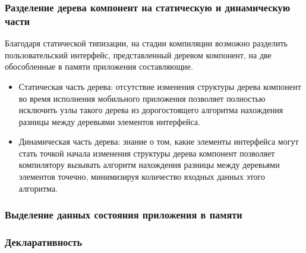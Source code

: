 \subsubsection*{Разделение дерева компонент на статическую и динамическую части}
Благодаря статической типизации, на стадии компиляции возможно разделить
пользовательский интерфейс, представленный деревом компонент,
на две обособленные в памяти приложения составляющие.
\begin{itemize}
	\item Статическая часть дерева: отсутствие изменения структуры
	дерева компонент во время исполнения мобильного приложения позволяет
	полностью исключить узлы такого дерева из дорогостоящего алгоритма
	нахождения разницы между деревьями элементов интерфейса.
	\item Динамическая часть дерева: знание о том, какие элементы
	интерфейса могут стать точкой начала изменения структуры дерева
	компонент позволяет компилятору вызывать алгоритм нахождения разницы
	между деревьями элементов точечно, минимизируя количество входных
	данных этого алгоритма.
\end{itemize}


\subsubsection*{Выделение данных состояния приложения в памяти}


\subsubsection*{Декларативность}
